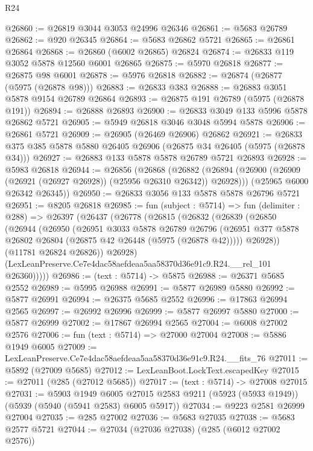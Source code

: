 \begin{lexlean}{R24}
\begin{coremodule}
@26860 := @26819 @3044 @3053 @24996 @26346
@26861 := @5683 @26789
@26862 := @920 @26345
@26864 := @5683 @26862 @5721
@26865 := @26861 @26864
@26868 := @26860 (@6002 @26865) @26824
@26874 := @26833 @119 @3052 @5878 @12560 @6001 @26865
@26875 := @5970 @26818
@26877 := @26875 @98 @6001
@26878 := @5976 @26818
@26882 := @26874 (@26877 (@5975 (@26878 @98)))
@26883 := @26833 @383
@26888 := @26883 @3051 @5878 @9154 @26789 @26864
@26893 := @26875 @191 @26789 (@5975 (@26878 @191))
@26894 := @26888 @26893
@26900 := @26833 @3049 @133 @5996 @5878 @26862 @5721
@26905 := @5949 @26818 @3046 @3048 @5994 @5878
@26906 := @26861 @5721
@26909 := @26905 (@26469 @26906) @26862
@26921 := @26833 @375 @385 @5878 @5880 @26405 @26906 (@26875 @34 @26405 (@5975 (@26878 @34)))
@26927 := @26883 @133 @5878 @5878 @26789 @5721 @26893
@26928 := @5983 @26818
@26944 := @26856
    (@26868
      (@26882 (@26894 (@26900 (@26909 (@26921 (@26927 @26928)) (@25956 @26310 @26342)) @26928)))
      (@25965 @6000 @26342 @26345))
@26950 := @26833 @3056 @133 @5878 @5878 @26796 @5721
@26951 := @8205 @26818
@26985 := fun (subject : @5714) =>
  fun (delimiter : @288) =>
  @26397
    (@26437
      (@26778
        (@26815
          (@26832
            (@26839
              (@26850
                (@26944
                  (@26950
                    (@26951
                      @3033
                      @5878
                      @26789
                      @26796
                      (@26951 @377 @5878 @26802 @26804 (@26875 @42 @26448 (@5975 (@26878 @42)))))
                    @26928))
                (@11781 @26824 @26826))
              @26928)
            (LexLeanPreserve.Ce7e4dac58aefdeaa5aa58370d36e91c9.R24.__rel_101 @26360)))))
@26986 := (text : @5714) -> @5875
@26988 := @26371 @5685 @2552
@26989 := @5995 @26988
@26991 := @5877 @26989 @5880
@26992 := @5877 @26991
@26994 := @26375 @5685 @2552
@26996 := @17863 @26994 @2565
@26997 := @26992 @26996
@26999 := @5877 @26997 @5880
@27000 := @5877 @26999
@27002 := @17867 @26994 @2565
@27004 := @6008 @27002 @2576
@27006 := fun (text : @5714) => @27000 @27004
@27008 := @5886 @1949 @6005
@27009 := LexLeanPreserve.Ce7e4dac58aefdeaa5aa58370d36e91c9.R24.__fits_76
@27011 := @5892 (@27009 @5685)
@27012 := LexLeanBoot.LockText.escapedKey
@27015 := @27011 (@285 (@27012 @5685))
@27017 := (text : @5714) -> @27008 @27015
@27031 := @5903
    @1949
    @6005
    @27015
    @2583
    @9211
    (@5923 (@5933 @1949))
    (@5939 (@5940 (@5941 @2583) @6005 @5917))
@27034 := @9223 @2581 @26999 @27004
@27035 := @285 @27002
@27036 := @5683 @27035
@27038 := @5683 @2577 @5721
@27044 := @27034 (@27036 @27038) (@285 (@6012 @27002 @2576))

\end{coremodule}
\end{lexlean}
